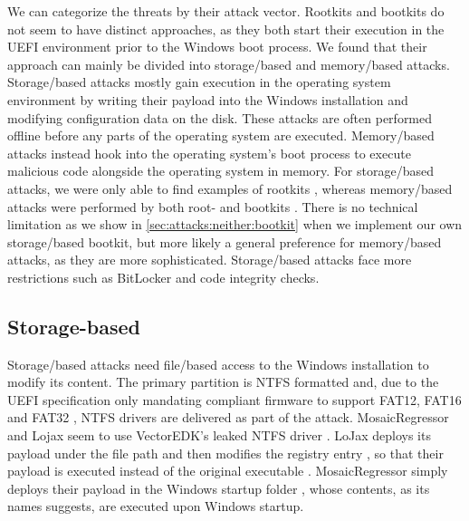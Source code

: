 We can categorize the threats by their attack vector.
Rootkits and bootkits do not seem to have distinct approaches, as they both start their execution in the \ac{UEFI} environment prior to the Windows boot process.
We found that their approach can mainly be divided into storage\-/based and memory\-/based attacks.
Storage\-/based attacks mostly gain execution in the operating system environment by writing their payload into the Windows installation and modifying configuration data on the disk.
These attacks are often performed offline before any parts of the operating system are executed.
Memory\-/based attacks instead hook into the operating system's boot process to execute malicious code alongside the operating system in memory.
For storage\-/based attacks, we were only able to find examples of rootkits \cite{vector-edk,mosaicregressor-technical-details,lojax}, whereas memory\-/based attacks were performed by both root- and bootkits \cite{dreamboot,efiguard,especter,finspy,moonbounce,cosmicstrand}.
There is no technical limitation as we show in \autoref{sec:attacks:neither:bootkit} when we implement our own storage\-/based bootkit, but more likely a general preference for memory\-/based attacks, as they are more sophisticated.
Storage\-/based attacks face more restrictions such as BitLocker and code integrity checks.

\subsection{Storage-based}

Storage\-/based attacks need file\-/based access to the Windows installation to modify its content.
The primary partition is \ac{NTFS} formatted and, due to the \ac{UEFI} specification only mandating compliant firmware to support \ac{FAT}12, \ac{FAT}16 and \ac{FAT}32 \cite[Section 13.3.1.1]{uefi-spec}, \ac{NTFS} drivers are delivered as part of the attack.
MosaicRegressor and Lojax seem to use VectorEDK's leaked \ac{NTFS} driver \cite{mosaicregressor-technical-details, lojax}.
LoJax deploys its payload under the file path  and then modifies the registry entry , so that their payload is executed instead of the original executable \cite{lojax}.
MosaicRegressor simply deploys their payload in the Windows startup folder \cite{mosaicregressor-technical-details}, whose contents, as its names suggests, are executed upon Windows startup.

